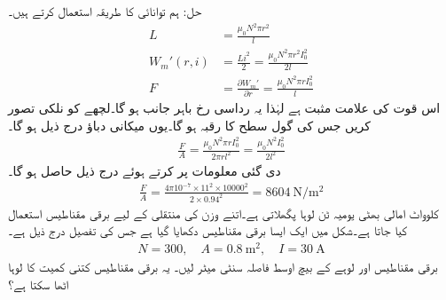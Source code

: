 حل:\quad 
ہم توانائی کا طریقہ استعمال کرتے ہیں۔
\begin{align*}
L&=\frac{\mu_0 N^2 \pi r^2}{l}\\
W_m'(r,i)&=\frac{L i^2}{2}=\frac{\mu_0 N^2 \pi r^2 I_0^2}{2 l}\\
F&=\frac{\partial W_m'}{\partial r}=\frac{\mu_0 N^2 \pi r I_0^2}{l}
\end{align*}
اس قوت کی علامت  مثبت ہے لہٰذا یہ رداسی رخ  باہر جانب ہو گا۔لچھے کو نلکی تصور کریں جس کی گول سطح  کا رقبہ  ہو گا۔یوں میکانی دباؤ درج ذیل ہو گا۔
\begin{align*}
\frac{F}{A}=\frac{\mu_0 N^2 \pi r I_0^2}{2\pi r l^2}=\frac{\mu_0 N^2  I_0^2}{2 l^2}
\end{align*}
دی گئی معلومات پر کرتے ہوئے درج ذیل  حاصل ہو گا۔
\begin{align*}
\frac{F}{A}=\frac{4\pi 10^{-7} \times 11^2 \times \num{10000}^2 }{2 \times 0.94^2}=\SI{8604}{\newton \per \meter \squared}
\end{align*}
%
   کلوواٹ امالی بھٹی یومیہ  ٹن لوہا  پگھلاتی ہے۔اتنے وزن کی منتقلی کے لیے برقی مقناطیس استعمال کیا جاتا ہے۔شکل  میں ایک ایسا  برقی مقناطیس دکھایا گیا ہے جس کی تفصیل درج ذیل ہے۔
\begin{align*}
N=300, \quad A=\SI{0.8}{\meter \squared}, \quad I=\SI{30}{\ampere}
\end{align*}
برقی مقناطیس اور لوہے کے بیچ اوسط فاصلہ  سنٹی میٹر لیں۔ یہ برقی مقناطیس کتنی کمیت کا لوہا اٹھا سکتا ہے؟
